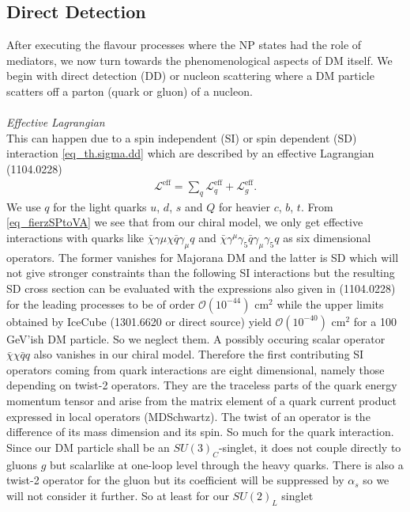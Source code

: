 \subsection{Direct Detection}
After executing the flavour processes where the NP states had the role of mediators, we now turn towards the phenomenological aspects of DM itself.
We begin with direct detection (DD) or nucleon scattering where a DM particle scatters off a parton (quark or gluon) of a nucleon. 
\\ \\ \textit{Effective Lagrangian}\\
This can happen
due to a spin independent (SI) or spin dependent (SD) interaction \eqref{eq_th.sigma.dd} which are described by an effective Lagrangian (1104.0228)
\begin{align}
 \mathcal{L}^\text{eff} = \sum\limits_{q} \mathcal{L}^\text{eff}_q + \mathcal{L}^\text{eff}_g.
\end{align}
We use $q$ for the light quarks $u$, $d$, $s$ and $Q$ for heavier $c$, $b$, $t$. From \eqref{eq_fierzSPtoVA} we see that from our chiral model, 
we only get effective interactions with quarks like $\bar \chi\gamma\mu\chi \bar q\gamma_\mu q$ and $\bar \chi\gamma^\mu\gamma_5 \bar q\gamma_\mu \gamma_5 q$
as six dimensional operators. The former vanishes for Majorana DM and the latter is SD which will not give stronger constraints than the following SI
interactions but the resulting SD cross section can be evaluated with the expressions also given in (1104.0228) for the leading processes to be of
order $\mathcal{O}(10^{-44})$ cm$^2$ while the upper limits obtained by IceCube (1301.6620 or direct source) yield $\mathcal{O}(10^{-40})$ cm$^2$ for 
a 100 GeV'ish DM particle.
So we neglect them. A possibly occuring scalar operator $\bar \chi \chi \bar q q$ also vanishes in our chiral model. Therefore the first contributing
SI operators coming from quark interactions are eight dimensional, namely those depending on twist-2 operators. They are the traceless parts of the
quark energy momentum tensor and arise from the matrix element of a quark current product expressed in local operators (MDSchwartz). The twist of 
an operator is the difference of its mass dimension and its spin. So much for the quark interaction. Since our DM particle shall be an 
$SU(3)_C$-singlet, it does not couple directly to gluons $g$ but scalarlike at one-loop level through the heavy quarks. There is also a twist-2 
operator for the gluon but its coefficient will be suppressed by $\alpha_s$ so we will not consider it further. So at least for our $SU(2)_L$ singlet
